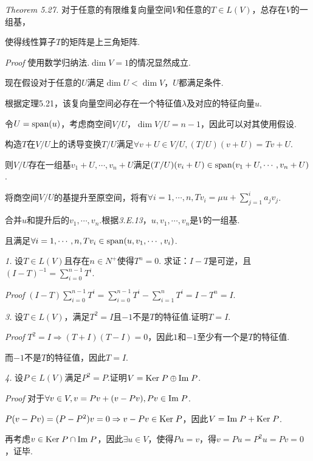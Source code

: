 \textit{Theorem 5.27.}
对于任意的有限维复向量空间\(V\)和任意的\(T \in L(V)\)，总存在\(V\)的一组基，

使得线性算子\(T\)的矩阵是上三角矩阵.

\textit{Proof}
使用数学归纳法.\(\dim V=1\)的情况显然成立.

现在假设对于任意的\(U\)满足\(\dim U<\dim V\)，\(U\)都满足条件.

根据定理5.21，该复向量空间必存在一个特征值\(\lambda\)及对应的特征向量\(u\).

令\(U=\mathrm{span}(u)\)，考虑商空间\(V/U\)，\(\dim V/U=n-1\)，因此可以对其使用假设.

构造\(T\)在\(V/U\)上的诱导变换\(T/U\)满足\(\forall v+U \in V/U,(T/U)(v+U)=Tv+U\).

则\(V/U\)存在一组基\(v_1+U,\cdots,v_n+U\)满足\((T/U)(v_i+U) \in \mathrm{span}(v_1+U,\cdots,v_n+U)\).

将商空间\(V/U\)的基提升至原空间，将有\(\forall i=1,\cdots,n,Tv_i=\mu u+\sum_{j=1}^i a_jv_j\).

合并\(u\)和提升后的\(v_1,\cdots,v_n\).根据\textit{3.E.13}，\(u,v_1,\cdots,v_n\)是\(V\)的一组基.

且满足\(\forall i=1,\cdots,n,Tv_i \in \mathrm{span}(u,v_1,\cdots,v_i)\).

\hspace*{\fill}

\textit{1.}
设\(T \in L(V)\)且存在\(n \in N^+\)使得\(T^n=0\).
求证：\(I-T\)是可逆，且\((I-T)^{-1}=\sum_{i=0}^{n-1} T^i\).

\textit{Proof}
\((I-T)\sum_{i=0}^{n-1} T^i=\sum_{i=0}^{n-1} T^i-\sum_{i=1}^n T^i=I-T^n=I\).

\hspace*{\fill}

\textit{3.}
设\(T \in L(V)\)，满足\(T^2=I\)且\(-1\)不是\(T\)的特征值.证明\(T=I\).

\textit{Proof}
\(T^2=I \Rightarrow (T+I)(T-I)=0\)，因此\(1\)和\(-1\)至少有一个是\(T\)的特征值.

而\(-1\)不是\(T\)的特征值，因此\(T=I\).

\hspace*{\fill}

\textit{4.}
设\(P \in L(V)\)满足\(P^2=P\).证明\(V=\mathrm{Ker \;} P \oplus \mathrm{Im \;} P\).

\textit{Proof}
对于\(\forall v \in V,v=Pv+(v-Pv),Pv \in \mathrm{Im \;} P\).

\(P(v-Pv)=(P-P^2)v=0 \Rightarrow v-Pv \in \mathrm{Ker \;} P\)，因此\(V=\mathrm{Im \;} P+\mathrm{Ker \;} P\).

再考虑\(v \in \mathrm{Ker \;} P \cap \mathrm{Im \;} P\)，因此\(\exists u \in V\)，使得\(Pu=v\)，得\(v=Pu=P^2u=Pv=0\)，证毕.

